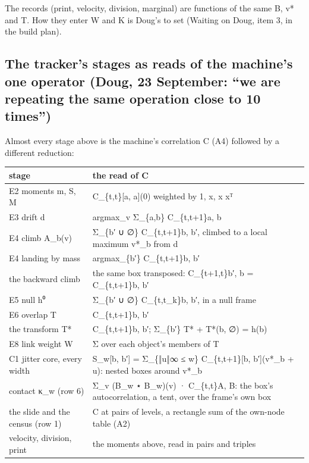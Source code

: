 The records (print, velocity, division, marginal) are functions of the same B, v* and T. How they enter W and K is Doug's to set (Waiting on Doug, item 3, in the build plan).

\subsection{\texorpdfstring{The tracker's stages as reads of the machine's one operator (Doug, 23 September: “we are repeating the same operation close to 10 times”)}{The tracker's stages as reads of the machine's one operator (Doug, 23 September: "we are repeating the same operation close to 10 times")}}

Almost every stage above is the machine's correlation C (A4) followed by a different reduction:

{\small
\setlength{\tabcolsep}{6pt}
\begin{longtable}{>{\RaggedRight\arraybackslash}p{}>{\RaggedRight\arraybackslash}p{}}
\toprule
stage & the read of C \\
\midrule
\endhead
E2 moments m, S, M & C\_\allowbreak{}\{t,t\}[a, a](0) weighted by 1, x, x xᵀ \\
E3 drift d & argmax\_\allowbreak{}v Σ\_\allowbreak{}\{a,b\} C\_\allowbreak{}\{t,t+1\}a, b \\
E4 climb A\_\allowbreak{}b(v) & Σ\_\allowbreak{}\{b′ ∪ ∅\} C\_\allowbreak{}\{t,t+1\}b, b′, climbed to a local maximum v*\_\allowbreak{}b from d \\
E4 landing by mass & argmax\_\allowbreak{}\{b′\} C\_\allowbreak{}\{t,t+1\}b, b′ \\
the backward climb & the same box transposed: C\_\allowbreak{}\{t+1,t\}b′, b = C\_\allowbreak{}\{t,t+1\}b, b′ \\
E5 null h⁰ & Σ\_\allowbreak{}\{b′ ∪ ∅\} C\_\allowbreak{}\{t,t\_\allowbreak{}k\}b, b′, in a null frame \\
E6 overlap T & C\_\allowbreak{}\{t,t+1\}b, b′ \\
the transform T* & C\_\allowbreak{}\{t,t+1\}b, b′; Σ\_\allowbreak{}\{b′\} T* + T*(b, ∅) = h(b) \\
E8 link weight W & Σ over each object's members of T \\
C1 jitter core, every width & S\_\allowbreak{}w[b, b′] = Σ\_\allowbreak{}\{‖u‖∞ ≤ w\} C\_\allowbreak{}\{t,t+1\}[b, b′](v*\_\allowbreak{}b + u): nested boxes around v*\_\allowbreak{}b \\
contact κ\_\allowbreak{}w (row 6) & Σ\_\allowbreak{}v (B\_\allowbreak{}w ⋆ B\_\allowbreak{}w)(v) · C\_\allowbreak{}\{t,t\}A, B: the box's autocorrelation, a tent, over the frame's own box \\
the slide and the census (row 1) & C at pairs of levels, a rectangle sum of the own-node table (A2) \\
velocity, division, print & the moments above, read in pairs and triples \\
\bottomrule
\end{longtable}
}

